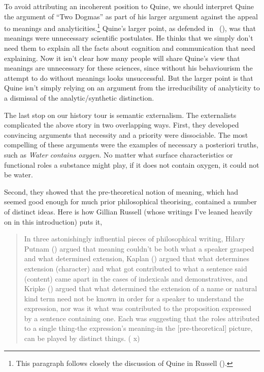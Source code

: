 \documentclass[
  11pt,
  letterpaper,
  DIV=11,
  numbers=noendperiod,
  twoside]{scrartcl}
\begin{document}
To avoid attributing an incoherent position to Quine, we should
interpret Quine the argument of ``Two Dogmas'' as part of his larger
argument against the appeal to meanings and analyticities.\footnote{This
  paragraph follows closely the discussion of Quine in Russell
  ().} Quine's larger point, as defended
in ~(), was that meanings were
unnecessary scientific postulates. He thinks that we simply don't need
them to explain all the facts about cognition and communication that
need explaining. Now it isn't clear how many people will share Quine's
view that meanings are unnecessary for these sciences, since without his
behaviourism the attempt to do without meanings looks unsuccessful. But
the larger point is that Quine isn't simply relying on an argument from
the irreducibility of analyticity to a dismissal of the
analytic/synthetic distinction.

The last stop on our history tour is semantic externalism. The
externalists complicated the above story in two overlapping ways. First,
they developed convincing arguments that necessity and a priority were
dissociable. The most compelling of these arguments were the examples of
necessary a posteriori truths, such as \emph{Water contains oxygen}. No
matter what surface characteristics or functional roles a substance
might play, if it does not contain oxygen, it could not be water.

Second, they showed that the pre-theoretical notion of meaning, which
had seemed good enough for much prior philosophical theorising,
contained a number of distinct ideas. Here is how Gillian Russell (whose
writings I've leaned heavily on in this introduction) puts it,

\begin{quote}
In three astonishingly influential pieces of philosophical writing,
Hilary Putnam () argued that meaning
couldn't be both what a speaker grasped and what determined extension,
Kaplan () argued that what determines
extension (character) and what got contributed to what a sentence said
(content) came apart in the cases of indexicals and demonstratives, and
Kripke () argued that what
determined the extension of a name or natural kind term need not be
known in order for a speaker to understand the expression, nor was it
what was contributed to the proposition expressed by a sentence
containing one. Each was suggesting that the roles attributed to a
single thing-the expression's meaning-in the {[}pre-theoretical{]}
picture, can be played by distinct things.
( x)
\end{quote}
\end{document}
